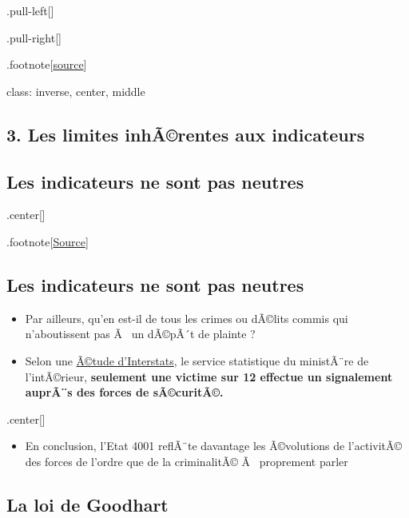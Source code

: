 \documentclass[]{article}
\providecommand{\tightlist}{%
  \setlength{\itemsep}{0pt}\setlength{\parskip}{0pt}}
\begin{document}
.pull-left{[}{]}

.pull-right{[}{]}

.footnote{[}\href{https://www.scoresante.org/sindicateurs.html}{source}{]}

class: inverse, center, middle

\subsection{3. Les limites inhÃ©rentes aux
indicateurs}\label{les-limites-inharentes-aux-indicateurs}

\subsection{Les indicateurs ne sont pas
neutres}\label{les-indicateurs-ne-sont-pas-neutres}

.center{[}{]}

.footnote{[}\href{http://www.lefigaro.fr/conjoncture/2018/01/30/20002-20180130ARTFIG00342-le-trafic-de-drogue-va-bientot-entrer-dans-le-calcul-du-pib-francais.php}{Source}{]}

\subsection{Les indicateurs ne sont pas
neutres}\label{les-indicateurs-ne-sont-pas-neutres-1}

\begin{itemize}
\tightlist
\item
  Par ailleurs, qu'en est-il de tous les crimes ou dÃ©lits commis qui
  n'aboutissent pas Ã~ un dÃ©pÃ´t de plainte ?
\item
  Selon une
  \href{https://www.interieur.gouv.fr/content/download/104138/823089/file/IA17.pdf}{Ã©tude
  d'Interstats}, le service statistique du ministÃ¨re de l'intÃ©rieur,
  \textbf{seulement une victime sur 12 effectue un signalement auprÃ¨s
  des forces de sÃ©curitÃ©.}
\end{itemize}

.center{[}{]}

\begin{itemize}
\tightlist
\item
  En conclusion, l'Etat 4001 reflÃ¨te davantage les Ã©volutions de
  l'activitÃ© des forces de l'ordre que de la criminalitÃ© Ã~ proprement
  parler
\end{itemize}

\subsection{La loi de Goodhart}\label{la-loi-de-goodhart}
\end{document}
